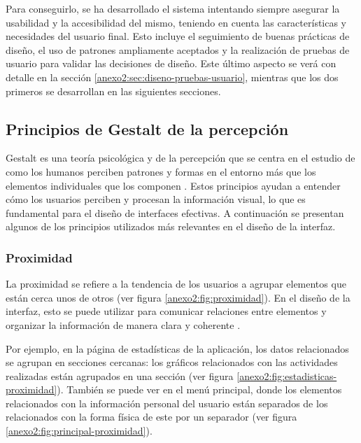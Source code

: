 Para conseguirlo, se ha desarrollado el sistema intentando siempre asegurar la
usabilidad y la accesibilidad del mismo, teniendo en cuenta las características
y necesidades del usuario final. Esto incluye el seguimiento de buenas prácticas
de diseño, el uso de patrones ampliamente aceptados y la realización de pruebas
de usuario para validar las decisiones de diseño. Este último aspecto se verá
con detalle en la sección \ref{anexo2:sec:diseno-pruebas-usuario}, mientras que
los dos primeros se desarrollan en las siguientes secciones.

\subsection{Principios de Gestalt de la percepción}
Gestalt es una teoría psicológica y de la percepción que se centra en el estudio
de como los humanos perciben patrones y formas en el entorno más que los
elementos individuales que los componen \parencite{Mather2006Foundations}. Estos
principios ayudan a entender cómo los usuarios perciben y procesan la
información visual, lo que es fundamental para el diseño de interfaces
efectivas. A continuación se presentan algunos de los principios utilizados más
relevantes en el diseño de la interfaz.

\subsubsection{Proximidad}
La proximidad se refiere a la tendencia de los usuarios a agrupar elementos que
están cerca unos de otros (ver figura \ref{anexo2:fig:proximidad}). En el diseño de la
interfaz, esto se puede utilizar para comunicar relaciones entre elementos y
organizar la información de manera clara y coherente
\parencite{Soegaard2015Gestalt}.


Por ejemplo, en la página de estadísticas de la aplicación, los datos relacionados
se agrupan en secciones cercanas: los gráficos relacionados con las actividades
realizadas están agrupados en una sección (ver figura
\ref{anexo2:fig:estadisticas-proximidad}). También se puede ver en el menú principal,
donde los elementos relacionados con la información personal del usuario están
separados de los relacionados con la forma física de este por un separador (ver
figura \ref{anexo2:fig:principal-proximidad}).

